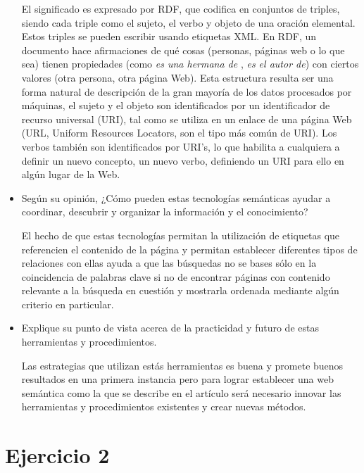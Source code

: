\documentclass[a4paper,12pt,oneside,final,spanish]{article}
\begin{document}
\begin{itemize}
El significado es expresado por RDF, que codifica en conjuntos de triples, siendo cada triple como el sujeto, el verbo y objeto de una oración elemental. Estos triples se pueden escribir usando etiquetas XML. En RDF, un documento hace afirmaciones de qué cosas (personas, páginas web o lo que sea) tienen propiedades (como \textit{es una hermana de} , \textit{es el autor de}) con ciertos valores (otra persona, otra página Web). Esta estructura resulta ser una forma natural de descripción de la gran mayoría de los datos procesados por máquinas, el sujeto y el objeto son identificados por un identificador de recurso universal (URI), tal como se utiliza en un enlace de una página Web (URL, Uniform Resources Locators, son el tipo más común de URI). Los verbos también son identificados por URI's, lo que habilita a cualquiera a definir un nuevo concepto, un nuevo verbo, definiendo un URI para ello en algún lugar de la Web.

\item Según su opinión, ¿Cómo pueden estas tecnologías semánticas ayudar a coordinar, descubrir y organizar la información y el conocimiento?

El hecho de que estas tecnologías permitan la utilización de etiquetas que referencien el contenido de la página y permitan establecer diferentes tipos de relaciones con ellas ayuda a que las búsquedas no se bases sólo en la coincidencia de palabras clave si no de encontrar páginas con contenido relevante a la búsqueda en cuestión y mostrarla ordenada mediante algún criterio en particular. 

\item Explique su punto de vista acerca de la practicidad y futuro de estas herramientas y procedimientos.

Las estrategias que utilizan estás herramientas es buena y promete buenos resultados en una primera instancia pero para lograr establecer una web semántica como la que se describe en el artículo será necesario innovar las herramientas y procedimientos existentes y crear nuevas métodos.
\end{itemize}


\section{Ejercicio 2}
\end{document}
